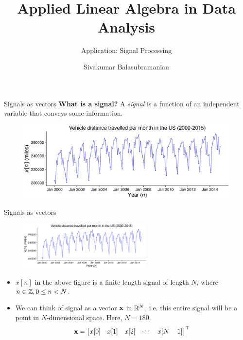\documentclass[aspectratio=169]{beamer}
\title{Applied Linear Algebra in Data Analysis}
\subtitle{Application: Signal Processing}
\author{Sivakumar Balasubramanian}
\institute[Christian Medical College] %
{
  \inst{}%
  Department of Bioengineering\\
  Christian Medical College, Bagayam\\
  Vellore 632002
}
\date{}
\let\olditem\item
\renewcommand{\item}{\setlength{\itemsep}{\fill}\olditem}
\def\mf{\ensuremath\mathbf}
\def\mb{\ensuremath\mathbb}
\def\bmx{\ensuremath\begin{bmatrix*}[r]}
\def\emx{\ensuremath\end{bmatrix*}}
\begin{document}
\begin{frame}
  \titlepage
\end{frame}



\begin{frame}[t]{Signals as vectors}
  \textbf{What is a signal?} A \textit{signal} is a function of an independent variable that conveys some information.
  \begin{figure}[h]
    \includegraphics[width=1\textwidth]{figs/miles.eps}
  \end{figure}
\end{frame}


\begin{frame}[t]{Signals as vectors}
  \begin{figure}[h]
    \includegraphics[width=0.6\textwidth]{figs/miles.eps}
  \end{figure}

  \begin{itemize}
    \item $x[n]$ in the above figure is a finite length signal of length $N$, where $n \in \mb{Z}, 0 \leq n < N$.
    \item We can think of signal as a vector $\mf{x}$ in $\mb{R}^N$, i.e. this entire signal will be a point in $N$-dimensional space. Here, $N= 180$.
    \[ \mf{x} = \bmx x[0] & x[1] & x[2] & \cdots & x[N-1]\emx^\top\]
  \end{itemize}
\end{frame}
\end{document}
